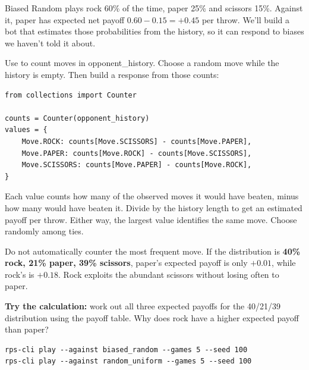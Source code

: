 \documentclass[11pt]{article}
\begin{document}
\thispagestyle{plain}


\clearpage

\clearpage
{}

\begin{context}
Biased Random plays rock 60\% of the time, paper 25\% and scissors 15\%. Against it, paper has expected net payoff $0.60-0.15=+0.45$ per throw. We'll build a bot that estimates those probabilities from the history, so it can respond to biases we haven't told it about.

\end{context}


Use  to count moves in opponent\_history. Choose a random move while the history is empty. Then build a response from those counts:


\begin{lstlisting}[style=python]
from collections import Counter

counts = Counter(opponent_history)
values = {
    Move.ROCK: counts[Move.SCISSORS] - counts[Move.PAPER],
    Move.PAPER: counts[Move.ROCK] - counts[Move.SCISSORS],
    Move.SCISSORS: counts[Move.PAPER] - counts[Move.ROCK],
}
\end{lstlisting}

Each value counts how many of the observed moves it would have beaten, minus how many would have beaten it. Divide by the history length to get an estimated payoff per throw. Either way, the largest value identifies the same move. Choose randomly among ties.


Do not automatically counter the most frequent move. If the distribution is \textbf{40\% rock, 21\% paper, 39\% scissors}, paper's expected payoff is only $+0.01$, while rock's is $+0.18$. Rock exploits the abundant scissors without losing often to paper.


\begin{checkpoint}
\textbf{Try the calculation:} work out all three expected payoffs for the 40/21/39 distribution using the payoff table. Why does rock have a higher expected payoff than paper?
\end{checkpoint}


\begin{lstlisting}[style=shell,numbers=none,xleftmargin=4pt,framexleftmargin=0pt]
rps-cli play --against biased_random --games 5 --seed 100
rps-cli play --against random_uniform --games 5 --seed 100
\end{lstlisting}
\end{document}
